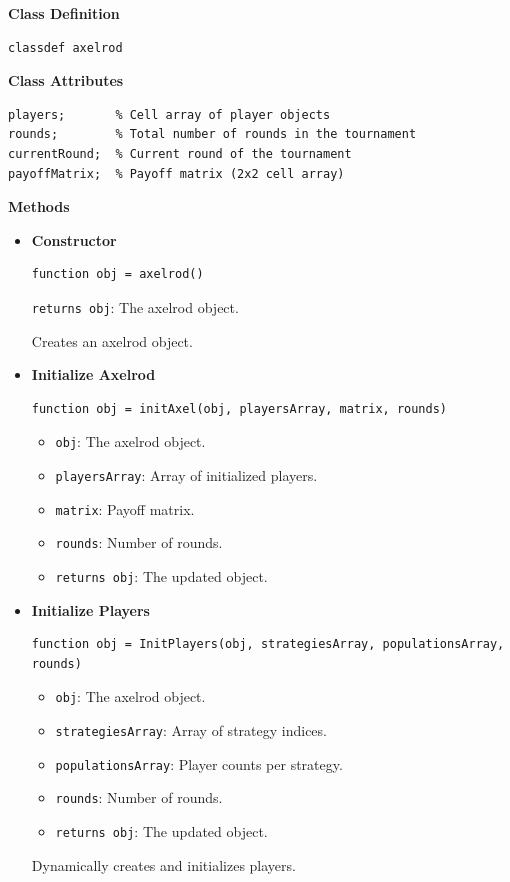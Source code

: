 \documentclass[12pt]{report}
\begin{document}
\textbf{Class Definition}
\begin{verbatim}
classdef axelrod
\end{verbatim}

\bigskip

\textbf{Class Attributes}
\begin{verbatim}
players;       % Cell array of player objects
rounds;        % Total number of rounds in the tournament
currentRound;  % Current round of the tournament
payoffMatrix;  % Payoff matrix (2x2 cell array)
\end{verbatim}

\bigskip

\textbf{Methods}
\begin{itemize}

  \item \textbf{Constructor}
  \begin{verbatim}
function obj = axelrod()
  \end{verbatim}
  \texttt{returns obj}: The axelrod object.

  Creates an axelrod object.

  \item \textbf{Initialize Axelrod}
  \begin{verbatim}
function obj = initAxel(obj, playersArray, matrix, rounds)
  \end{verbatim}
  \begin{itemize}
    \item \texttt{obj}: The axelrod object.
    \item \texttt{playersArray}: Array of initialized players.
    \item \texttt{matrix}: Payoff matrix.
    \item \texttt{rounds}: Number of rounds.
    \item \texttt{returns obj}: The updated object.
  \end{itemize}

  \item \textbf{Initialize Players}
  \begin{verbatim}
function obj = InitPlayers(obj, strategiesArray, populationsArray, rounds)
  \end{verbatim}
  \begin{itemize}
    \item \texttt{obj}: The axelrod object.
    \item \texttt{strategiesArray}: Array of strategy indices.
    \item \texttt{populationsArray}: Player counts per strategy.
    \item \texttt{rounds}: Number of rounds.
    \item \texttt{returns obj}: The updated object.
  \end{itemize}
  Dynamically creates and initializes players.


\end{itemize}
\end{document}
